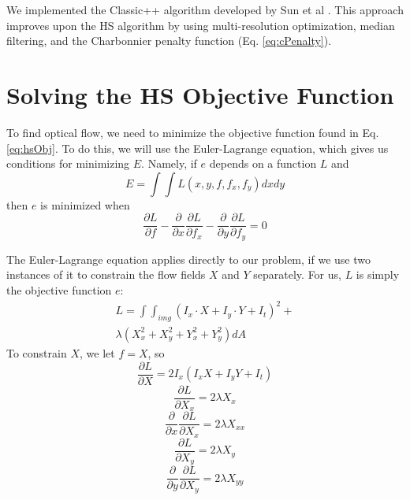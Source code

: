 \documentclass[10pt,twocolumn,letterpaper]{article}
\begin{document}
We implemented the Classic++ algorithm developed by Sun et al  \cite{sun}. This approach improves upon the HS algorithm by using multi-resolution optimization, median filtering, and the Charbonnier penalty function (Eq. \ref{eq:cPenalty}).

\section{Solving the HS Objective Function}

To find optical flow, we need to minimize the objective function found in Eq. \ref{eq:hsObj}.  To do this, we will use the Euler-Lagrange equation, which gives us conditions for minimizing $E$.  Namely, if $e$ depends on a function $L$ and
\begin{equation} \label{eq:eulerL}
E = \int \int L(x, y, f, f_x, f_y) dxdy
\end{equation}
then $e$ is minimized when 
\begin{equation} \label{eq:eulerCondition}
\frac{\partial L}{\partial f} - \frac{\partial}{\partial x} \frac{\partial L}{\partial f_x} - \frac{\partial}{\partial y} \frac{\partial L}{\partial f_y} = 0
\end{equation}

The Euler-Lagrange equation applies directly to our problem, if we use two instances of it to constrain the flow fields $X$ and $Y$ separately.  For us, $L$ is simply the objective function $e$: 
\begin{multline} \label{eq:eulerL2}
L =  \int \int_{img} (I_x \cdot X + I_y \cdot Y + I_t)^2 + \\
\lambda ( X_x^2 + X_y^2 + Y_x^2 + Y_y^2 ) dA 
\end{multline}
To constrain $X$, we let $f=X$, so 
\begin{equation} \label{eq:eulerPlug1}
\frac{\partial L}{\partial X} = 2I_x (I_x X + I_y Y + I_t)
\end{equation}
\begin{equation} \label{eq:eulerPlug2}
\frac{\partial L}{\partial X_x} = 2 \lambda X_x
\end{equation}
\begin{equation} \label{eq:eulerPlug3}
\frac{\partial}{\partial x} \frac{\partial L}{\partial X_x} = 2 \lambda X_{xx}
\end{equation}
\begin{equation} \label{eq:eulerPlug4}
\frac{\partial L}{\partial X_y} = 2 \lambda X_y
\end{equation}
\begin{equation} \label{eq:eulerPlug5}
\frac{\partial}{\partial y} \frac{\partial L}{\partial X_y} = 2 \lambda X_{yy}
\end{equation}
\end{document}
